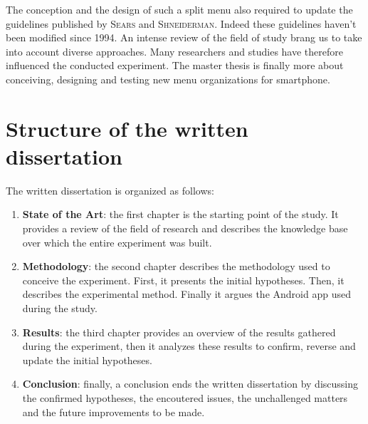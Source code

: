 The conception and the design of such a split menu also required to update the 
guidelines published by \textsc{Sears} and \textsc{Shneiderman}. Indeed these 
guidelines haven't been modified since 1994. An intense review of the field of 
study brang us to take into account diverse 
approaches. Many researchers and studies have therefore influenced the conducted 
experiment. The master thesis is finally more about conceiving, designing and 
testing new menu organizations for smartphone.

\section{Structure of the written dissertation}
The written dissertation is organized as follows:

\begin{enumerate}
  \item \textbf{State of the Art}: the first chapter is the starting point of 
the study. It provides a review of the field of research and describes the 
knowledge base over which the entire experiment was built.
  \item \textbf{Methodology}: the second chapter describes the methodology used 
to conceive the experiment. First, it presents the initial hypotheses. Then, it 
describes the experimental method. Finally it argues the Android app used 
during the study.
  \item \textbf{Results}: the third chapter provides an overview of the results 
gathered during the experiment, then it analyzes these results to 
confirm, reverse and update the initial hypotheses.
  \item \textbf{Conclusion}: finally, a conclusion ends the written 
dissertation by discussing the confirmed hypotheses, the encoutered issues, 
the unchallenged matters and the future improvements to be made.
\end{enumerate}


